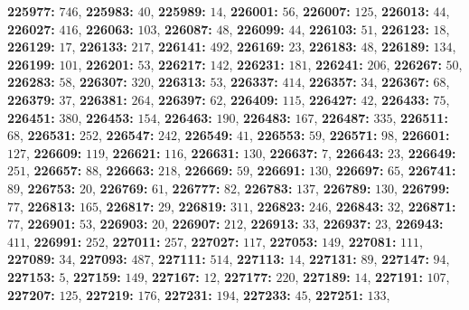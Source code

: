 \textsf{\bfseries 225977:} $746$, \textsf{\bfseries 225983:} $40$, \textsf{\bfseries 225989:} $14$, \textsf{\bfseries 226001:} $56$, \textsf{\bfseries 226007:} $125$, \textsf{\bfseries 226013:} $44$, \textsf{\bfseries 226027:} $416$, \textsf{\bfseries 226063:} $103$, \textsf{\bfseries 226087:} $48$, \textsf{\bfseries 226099:} $44$, \textsf{\bfseries 226103:} $51$, \textsf{\bfseries 226123:} $18$, \textsf{\bfseries 226129:} $17$, \textsf{\bfseries 226133:} $217$, \textsf{\bfseries 226141:} $492$, \textsf{\bfseries 226169:} $23$, \textsf{\bfseries 226183:} $48$, \textsf{\bfseries 226189:} $134$, \textsf{\bfseries 226199:} $101$, \textsf{\bfseries 226201:} $53$, \textsf{\bfseries 226217:} $142$, \textsf{\bfseries 226231:} $181$, \textsf{\bfseries 226241:} $206$, \textsf{\bfseries 226267:} $50$, \textsf{\bfseries 226283:} $58$, \textsf{\bfseries 226307:} $320$, \textsf{\bfseries 226313:} $53$, \textsf{\bfseries 226337:} $414$, \textsf{\bfseries 226357:} $34$, \textsf{\bfseries 226367:} $68$, \textsf{\bfseries 226379:} $37$, \textsf{\bfseries 226381:} $264$, \textsf{\bfseries 226397:} $62$, \textsf{\bfseries 226409:} $115$, \textsf{\bfseries 226427:} $42$, \textsf{\bfseries 226433:} $75$, \textsf{\bfseries 226451:} $380$, \textsf{\bfseries 226453:} $154$, \textsf{\bfseries 226463:} $190$, \textsf{\bfseries 226483:} $167$, \textsf{\bfseries 226487:} $335$, \textsf{\bfseries 226511:} $68$, \textsf{\bfseries 226531:} $252$, \textsf{\bfseries 226547:} $242$, \textsf{\bfseries 226549:} $41$, \textsf{\bfseries 226553:} $59$, \textsf{\bfseries 226571:} $98$, \textsf{\bfseries 226601:} $127$, \textsf{\bfseries 226609:} $119$, \textsf{\bfseries 226621:} $116$, \textsf{\bfseries 226631:} $130$, \textsf{\bfseries 226637:} $7$, \textsf{\bfseries 226643:} $23$, \textsf{\bfseries 226649:} $251$, \textsf{\bfseries 226657:} $88$, \textsf{\bfseries 226663:} $218$, \textsf{\bfseries 226669:} $59$, \textsf{\bfseries 226691:} $130$, \textsf{\bfseries 226697:} $65$, \textsf{\bfseries 226741:} $89$, \textsf{\bfseries 226753:} $20$, \textsf{\bfseries 226769:} $61$, \textsf{\bfseries 226777:} $82$, \textsf{\bfseries 226783:} $137$, \textsf{\bfseries 226789:} $130$, \textsf{\bfseries 226799:} $77$, \textsf{\bfseries 226813:} $165$, \textsf{\bfseries 226817:} $29$, \textsf{\bfseries 226819:} $311$, \textsf{\bfseries 226823:} $246$, \textsf{\bfseries 226843:} $32$, \textsf{\bfseries 226871:} $77$, \textsf{\bfseries 226901:} $53$, \textsf{\bfseries 226903:} $20$, \textsf{\bfseries 226907:} $212$, \textsf{\bfseries 226913:} $33$, \textsf{\bfseries 226937:} $23$, \textsf{\bfseries 226943:} $411$, \textsf{\bfseries 226991:} $252$, \textsf{\bfseries 227011:} $257$, \textsf{\bfseries 227027:} $117$, \textsf{\bfseries 227053:} $149$, \textsf{\bfseries 227081:} $111$, \textsf{\bfseries 227089:} $34$, \textsf{\bfseries 227093:} $487$, \textsf{\bfseries 227111:} $514$, \textsf{\bfseries 227113:} $14$, \textsf{\bfseries 227131:} $89$, \textsf{\bfseries 227147:} $94$, \textsf{\bfseries 227153:} $5$, \textsf{\bfseries 227159:} $149$, \textsf{\bfseries 227167:} $12$, \textsf{\bfseries 227177:} $220$, \textsf{\bfseries 227189:} $14$, \textsf{\bfseries 227191:} $107$, \textsf{\bfseries 227207:} $125$, \textsf{\bfseries 227219:} $176$, \textsf{\bfseries 227231:} $194$, \textsf{\bfseries 227233:} $45$, \textsf{\bfseries 227251:} $133$, 
